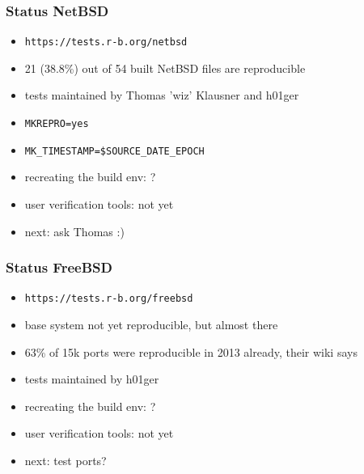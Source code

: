 \documentclass[14pt]{beamer}
\begin{document}
\begin{frame}
 \frametitle{Status NetBSD}
 \begin{itemize}
  \item \texttt{https://tests.r-b.org/netbsd}
  \item 21 (38.8\%) out of 54 built NetBSD files are reproducible
  \item tests maintained by Thomas 'wiz' Klausner and h01ger
  \item \texttt{MKREPRO=yes}
  \item \texttt{MK\_TIMESTAMP=\$SOURCE\_DATE\_EPOCH}
  \item recreating the build env: ?
  \item user verification tools: not yet
  \item next: ask Thomas :)
 \end{itemize}
\end{frame}

\begin{frame}
 \frametitle{Status FreeBSD}
 \begin{itemize}
  \item \texttt{https://tests.r-b.org/freebsd}
  \item base system not yet reproducible, but almost there
  \item 63\% of 15k ports were reproducible in 2013 already, their wiki says
  \item tests maintained by h01ger
  \item recreating the build env: ?
  \item user verification tools: not yet
  \item next: test ports?
 \end{itemize}
\end{frame}
\end{document}
